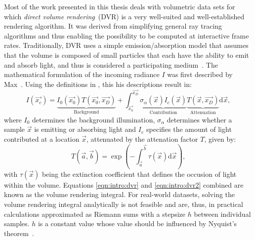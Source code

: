 Most of the work presented in this thesis deals with  volumetric data sets for which \emph{direct volume rendering}~(DVR) is a very well-suited and well-established rendering algorithm. It was derived from simplifying general ray tracing algorithms and thus enabling the possibility to be computed at interactive frame rates.  Traditionally, DVR uses a simple emission/absorption model that assumes that the volume is composed of small particles that each have the ability to emit and absorb light, and thus is considered a participating medium~\cite{levoy1988display, drebin1988volume, sabella1988rendering}.  The mathematical formulation of the incoming radiance $I$ was first described by Max~\cite{max1995optical, max2010local}.  Using the definitions in , this his descriptions result in:
\begin{equation}
I(\vec{x_c}) = \underbrace{I_0 \left( \vec{x_0} \right) T\left( \vec{x_0}, \vec{x_D} \right)}_{\textrm{Background}} + \int_\vec{x_0}^\vec{x_D} \underbrace{\sigma_\alpha(\vec{x}) I_c(\vec{x})}_{\textrm{Contribution}}  \underbrace{T(\vec{x}, \vec{x_D})}_{\textrm{Attenuation}} \textrm{d} \vec{x},
\label{eqn:intro:dvr}
\end{equation}
\noindent where $I_0$ determines the background illumination, $\sigma_\alpha$ determines whether a sample $\vec{x}$ is emitting or absorbing light and $I_e$ specifies the amount of light contributed at a location $\vec{x}$, attenuated by the attenation factor $T$, given by:
\begin{equation}
T(\vec{a}, \vec{b}) = \exp \left( -\int_\vec{a}^\vec{b} \tau(\vec{x}) \textrm{d} \vec{x} \right),
\label{eqn:intro:dvr2}
\end{equation}
\noindent with $\tau(\vec{x})$ being the extinction coefficient that defines the occusion of light within the volume.  Equations \ref{eqn:intro:dvr} and \ref{eqn:intro:dvr2} combined are known as the volume rendering integral.  For real-world datasets, solving the volume rendering integral analytically is not feasible and are, thus, in practical calculations approximated as Riemann sums with a stepsize $h$ between individual samples.  $h$ is a constant value whose value should be influenced by Nyquist's theorem~\cite{shannon1949communication}.


